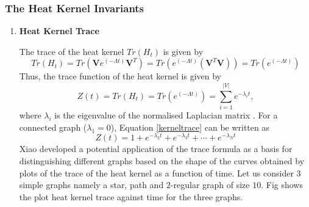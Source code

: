 \documentclass[10pt,a4paper]{article}
\begin{document}
        \subsubsection{The Heat Kernel Invariants}
        \begin{enumerate}[1]
        	\item \textbf{Heat Kernel Trace}
        	
        	The trace of the heat kernel $Tr(H_t)$ is given by
        	\begin{equation}
        	Tr(H_t) = Tr(\mathbf{V} e^{(-\Lambda t)} \mathbf{V}^T)=Tr( e^{(-\Lambda t)} (\mathbf{V}^T \mathbf{V})) = Tr(e^{(-\Lambda t)})
        	\end{equation}
        	Thus, the trace function of the heat kernel is given by 
        	\begin{equation}
        	Z(t) = Tr(H_t) = Tr(e^{(-\Lambda t)}) = \sum_{i=1}^{|V|} e^{-\lambda_i t},
        	\label{kerneltrace}
        	\end{equation}
        	where $\lambda_i$ is the eigenvalue of the normalised Laplacian matrix \cite{xiao2009graph}. 
        	For a connected graph ($\lambda_1 = 0$), Equation \ref{kerneltrace} can be written as 
        	\begin{equation}
        	Z(t) =  1+ e^{-\lambda_2 t} + e^{-\lambda_3t} + \cdots + e^{-\lambda_N t}
        	\end{equation}
        	Xiao \cite{xiao2009graph} developed a potential application of the trace formula as a basis for distinguishing different graphs based on the shape of the curves obtained by plots of the trace of the heat kernel as a function of time. Let us consider $3$ simple graphs namely a star, path and $2$-regular graph of size $10$. Fig shows the plot heat kernel trace against time for the three graphs.
        	

\end{enumerate}
\end{document}
